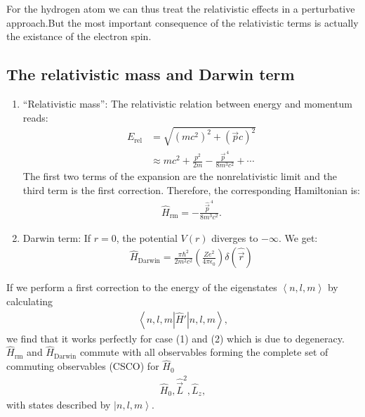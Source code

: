 \documentclass[10pt]{article}
\newcommand{\ket}[1]{\ensuremath{\left|#1\right\rangle}}
\newcommand{\braket}[1]{\ensuremath{\left\langle#1\right\rangle}}
\begin{document}
For the hydrogen atom we can thus treat the relativistic effects in a perturbative approach.But the most important consequence of the relativistic terms is actually the existance of the electron spin.

\subsection{The relativistic mass and Darwin term}


\begin{enumerate}
\item ``Relativistic mass'':
The relativistic relation between energy and momentum reads:
\begin{align}
E_\text{rel} &= \sqrt{(mc^2)^2+(\vec{p}c)^2}\\
&\approx mc^2 + \frac{p^2}{2m}- \frac{\vec{p}^{\,4}}{8m^3c^2} + \cdots
\end{align}
The first two terms of the expansion are the nonrelativistic limit and the third term is the first correction. Therefore, the corresponding Hamiltonian is:
\begin{align}
\hat{H}_\text{rm} = - \frac{\hat{\vec{p}}^{\,4}}{8m^3c^2}.
\end{align}

\item Darwin term:
If $r=0$, the potential $V(r)$ diverges to $-\infty$. We get:
\begin{align}
\hat{H}_\text{Darwin} = \frac{\pi \hbar^2}{2m^2c^2}\left( \frac{Ze^2}{4\pi\epsilon_0}\right) \delta(\hat{\vec{r}})
\end{align}

\end{enumerate}

If we perform a first correction to the energy of the eigenstates $\braket{n,l,m}$ by calculating
%
\begin{align}
\braket{n,l,m|\hat{H}'|n,l,m},
\end{align}
%
we find that it works perfectly for case (1) and (2) which is due to degeneracy.
$\hat{H}_\text{rm}$ and $\hat{H}_\text{Darwin}$ commute with all observables forming the complete set of commuting observables (CSCO) for $\hat{H}_0$
\begin{align}
\hat{H}_0,\hat{\vec{L}}^2, \hat{L}_z,
\end{align}
%
with states described by $\ket{n,l,m}$.

\FloatBarrier


\end{document}
